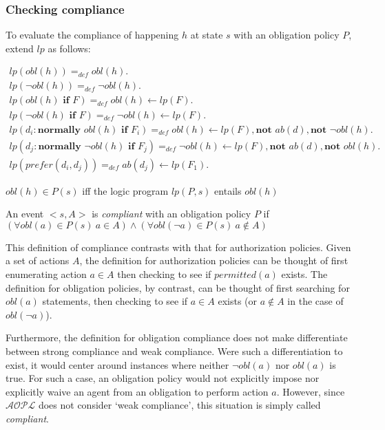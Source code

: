 \subsubsection{Checking compliance}

To evaluate the compliance of happening $h$ at state $s$ with an obligation policy $P$, \citet{gelfond_authorization_2008} extend $lp$ as follows:

\begin{gather}
    lp(obl(h)) =_{def}
        obl(h). \\
    lp(\neg obl(h)) =_{def}
        \neg obl(h). \\
    lp(obl(h) \textbf{ if } F) =_{def}
        obl(h) \leftarrow
            lp(F). \\
    lp(\neg obl(h) \textbf{ if } F) =_{def}
        \neg obl(h) \leftarrow
            lp(F). \\
    lp(d_i: \textbf{normally } obl(h) \textbf{ if } F_i) =_{def}
        obl(h) \leftarrow
            lp(F),
            \textbf{not } ab(d),
            \textbf{not } \neg obl(h). \\
    lp(d_j: \textbf{normally } \neg obl(h) \textbf{ if } F_j) =_{def}
        \neg obl(h) \leftarrow
            lp(F),
            \textbf{not } ab(d),
            \textbf{not } obl(h). \\
    lp(prefer(d_i, d_j)) =_{def}
        ab(d_j) \leftarrow lp(F_1).
\end{gather}

\begin{definition}
    $obl(h) \in P(s)$ iff the logic program $lp(P, s)$ entails $obl(h)$
\end{definition}

\begin{definition}
    An event $<s, A>$ is \textit{compliant} with an obligation policy $P$ if $(\forall obl(a) \in P(s) \ a \in A) \land (\forall obl(\neg a) \in P(s) \ a \not \in A)$
\end{definition}

This definition of compliance contrasts with that for authorization policies.
Given a set of actions $A$, the definition for authorization policies can be thought of first enumerating action $a \in A$ then checking to see if $permitted(a)$ exists.
The definition for obligation policies, by contrast, can be thought of first searching for $obl(a)$ statements, then checking to see if $a \in A$ exists (or $a \not \in A$ in the case of $obl(\neg a)$).

Furthermore, the definition for obligation compliance does not make differentiate between strong compliance and weak compliance.
Were such a differentiation to exist, it would center around instances where neither $\neg obl(a)$ nor $obl(a)$ is true\footnotemark.
For such a case, an obligation policy would not explicitly impose nor explicitly waive an agent from an obligation to perform action $a$.
However, since $\mathcal{AOPL}$ does not consider `weak compliance', this situation is simply called \textit{compliant}.


